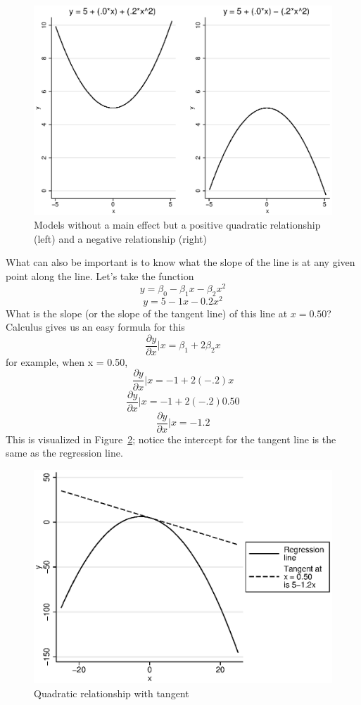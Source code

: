 \begin{figure}
   \centering
   \includegraphics[angle=0,
           width=.75\textwidth]{square4.eps}
   \caption{Models without a main effect but a positive quadratic relationship (left) and a negative relationship (right)}
  \label{fig:square4}
\end{figure}
What can also be important is to know what the slope of the line is at any given point along the line. Let's take the function
\[
y=\beta_0-\beta_1x-\beta_2x^2
\]
\[
y=5-1x-0.2x^2
\]
What is the slope (or the slope of the tangent line) of this line at $x = 0.50$? Calculus gives us an easy formula for this
\begin{equation}
\frac{\partial y}{\partial x}|x=\beta_1+2\beta_2x
\end{equation}
for example, when x = 0.50,
\[
\frac{\partial y}{\partial x}|x=-1+2\left(-.2\right)x
\]
\[
\frac{\partial y}{\partial x}|x=-1+2\left(-.2\right)0.50
\]
\[
\frac{\partial y}{\partial x}|x=-1.2
\]
This is visualized in Figure~\ref{fig:calc}; notice the intercept for the tangent line is the same as the regression line.
\begin{figure}
   \centering
   \includegraphics[angle=0,
           width=.75\textwidth]{calc.eps}
   \caption{Quadratic relationship with tangent}
  \label{fig:calc}
\end{figure}
